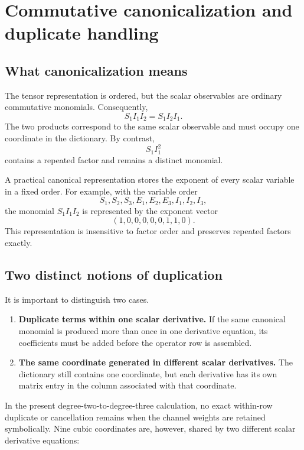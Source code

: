 \section{Commutative canonicalization and duplicate handling}
\label{sec:canonicalization}

\subsection{What canonicalization means}

The tensor representation is ordered, but the scalar observables are ordinary
commutative monomials. Consequently,
\[
S_1I_1I_2=S_1I_2I_1.
\]
The two products correspond to the same scalar observable and must occupy one
coordinate in the dictionary. By contrast,
\[
S_1I_1^2
\]
contains a repeated factor and remains a distinct monomial.

A practical canonical representation stores the exponent of every scalar
variable in a fixed order. For example, with the variable order
\[
S_1,S_2,S_3,E_1,E_2,E_3,I_1,I_2,I_3,
\]
the monomial $S_1I_1I_2$ is represented by the exponent vector
\[
(1,0,0,0,0,0,1,1,0).
\]
This representation is insensitive to factor order and preserves repeated
factors exactly.

\subsection{Two distinct notions of duplication}

It is important to distinguish two cases.

\begin{enumerate}[leftmargin=2em]
\item \textbf{Duplicate terms within one scalar derivative.} If the same
      canonical monomial is produced more than once in one derivative equation,
      its coefficients must be added before the operator row is assembled.
\item \textbf{The same coordinate generated in different scalar derivatives.}
      The dictionary still contains one coordinate, but each derivative has its
      own matrix entry in the column associated with that coordinate.
\end{enumerate}

In the present degree-two-to-degree-three calculation, no exact within-row
duplicate or cancellation remains when the channel weights are retained
symbolically. Nine cubic coordinates are, however, shared by two different
scalar derivative equations:

